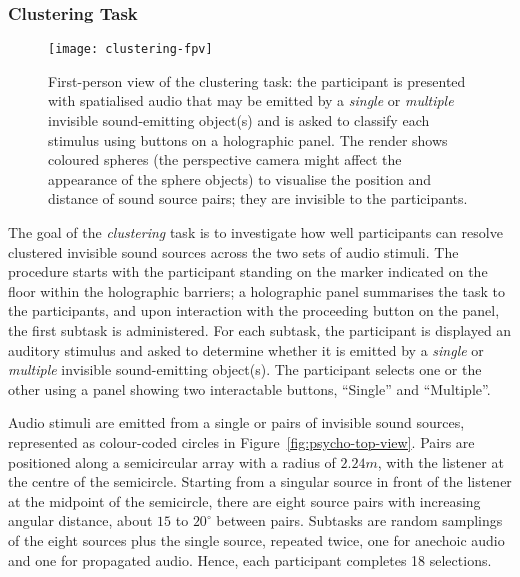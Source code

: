 \subsubsection{Clustering Task}
\begin{figure}[htbp]
    \centering
    \texttt{[image: clustering-fpv]}
    \caption[Participant's perspective of psychoacoustic testing --- clustering]{First-person view of the clustering task: the participant is presented with spatialised audio that may be emitted by a \emph{single} or \emph{multiple} invisible sound-emitting object(s) and is asked to classify each stimulus using buttons on a holographic panel. The render shows coloured spheres (the perspective camera might affect the appearance of the sphere objects) to visualise the position and distance of sound source pairs; they are invisible to the participants.}\label{fig:clustering-fpv}
\end{figure}
The goal of the \emph{clustering} task is to investigate how well participants can resolve clustered invisible sound sources across the two sets of audio stimuli. The procedure starts with the participant standing on the marker indicated on the floor within the holographic barriers; a holographic panel summarises the task to the participants, and upon interaction with the proceeding button on the panel, the first subtask is administered. For each subtask, the participant is displayed an auditory stimulus and asked to determine whether it is emitted by a \emph{single} or \emph{multiple} invisible sound-emitting object(s). The participant selects one or the other using a panel showing two interactable buttons, ``Single'' and ``Multiple''. \par
Audio stimuli are emitted from a single or pairs of invisible sound sources, represented as colour-coded circles in Figure~\ref{fig:psycho-top-view}. Pairs are positioned along a semicircular array with a radius of $2.24m$, with the listener at the centre of the semicircle. Starting from a singular source in front of the listener at the midpoint of the semicircle, there are eight source pairs with increasing angular distance, about $15$ to $20^\circ$ between pairs. Subtasks are random samplings of the eight sources plus the single source, repeated twice, one for anechoic audio and one for propagated audio. Hence, each participant completes 18 selections.\par


